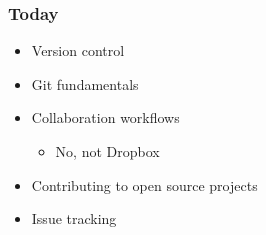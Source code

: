 \documentclass[glossy]{beamer}
\begin{document}
\begin{frame}[fragile=singleslide]
  \frametitle{Today}

  \begin{itemize}
    \item Version control
    \item Git fundamentals
    \item Collaboration workflows
    \begin{itemize}
      \item No, not Dropbox
    \end{itemize}
    \item Contributing to open source projects
    \item Issue tracking
  \end{itemize}
\end{frame}
\end{document}
